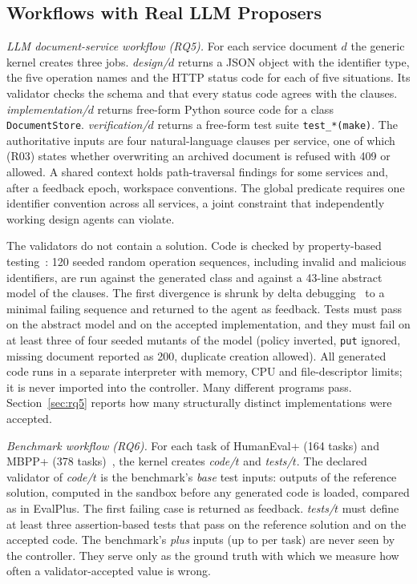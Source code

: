 \subsection{Workflows with Real LLM Proposers}\label{sec:llm-workflows}
\emph{LLM document-service workflow (RQ5).} For each service document $d$ the generic kernel creates three jobs. \emph{design/$d$} returns a JSON object with the identifier type, the five operation names and the HTTP status code for each of five situations. Its validator checks the schema and that every status code agrees with the clauses. \emph{implementation/$d$} returns free-form Python source code for a class \texttt{DocumentStore}. \emph{verification/$d$} returns a free-form test suite \texttt{test\_*(make)}. The authoritative inputs are four natural-language clauses per service, one of which (R03) states whether overwriting an archived document is refused with 409 or allowed. A shared context holds path-traversal findings for some services and, after a feedback epoch, workspace conventions. The global predicate requires one identifier convention across all services, a joint constraint that independently working design agents can violate.

The validators do not contain a solution. Code is checked by property-based testing~\cite{claessen2000quickcheck}: 120 seeded random operation sequences, including invalid and malicious identifiers, are run against the generated class and against a 43-line abstract model of the clauses. The first divergence is shrunk by delta debugging~\cite{zeller2002simplifying} to a minimal failing sequence and returned to the agent as feedback. Tests must pass on the abstract model and on the accepted implementation, and they must fail on at least three of four seeded mutants of the model (policy inverted, \texttt{put} ignored, missing document reported as 200, duplicate creation allowed). All generated code runs in a separate interpreter with memory, CPU and file-descriptor limits; it is never imported into the controller. Many different programs pass. Section~\ref{sec:rq5} reports how many structurally distinct implementations were accepted.

\emph{Benchmark workflow (RQ6).} For each task of HumanEval+ (164 tasks) and MBPP+ (378 tasks)~\cite{evalplus,chen2021humaneval,austin2021mbpp}, the kernel creates \emph{code/$t$} and \emph{tests/$t$}. The declared validator of \emph{code/$t$} is the benchmark's \emph{base} test inputs: outputs of the reference solution, computed in the sandbox before any generated code is loaded, compared as in EvalPlus. The first failing case is returned as feedback. \emph{tests/$t$} must define at least three assertion-based tests that pass on the reference solution and on the accepted code. The benchmark's \emph{plus} inputs (up to \BenchMaxPlus{} per task) are never seen by the controller. They serve only as the ground truth with which we measure how often a validator-accepted value is wrong.
